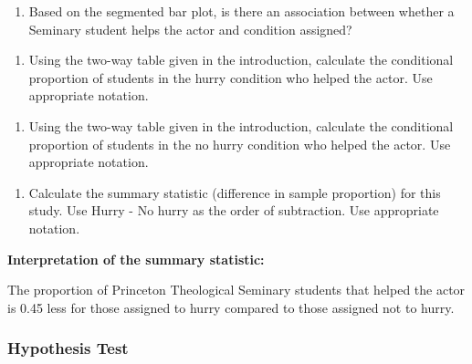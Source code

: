\documentclass[
]{report}
\providecommand{\tightlist}{%
  \setlength{\itemsep}{0pt}\setlength{\parskip}{0pt}}
\begin{document}
\begin{enumerate}
\def\labelenumi{\arabic{enumi}.}
\setcounter{enumi}{2}
\tightlist
\item
  Based on the segmented bar plot, is there an association between whether a Seminary student helps the actor and condition assigned?
\end{enumerate}

\vspace{0.4in}

\begin{enumerate}
\def\labelenumi{\arabic{enumi}.}
\setcounter{enumi}{3}
\tightlist
\item
  Using the two-way table given in the introduction, calculate the conditional proportion of students in the hurry condition who helped the actor. Use appropriate notation.
\end{enumerate}

\vspace{.3in}

\begin{enumerate}
\def\labelenumi{\arabic{enumi}.}
\setcounter{enumi}{4}
\tightlist
\item
  Using the two-way table given in the introduction, calculate the conditional proportion of students in the no hurry condition who helped the actor. Use appropriate notation.
\end{enumerate}

\vspace{.3in}

\begin{enumerate}
\def\labelenumi{\arabic{enumi}.}
\setcounter{enumi}{5}
\tightlist
\item
  Calculate the summary statistic (difference in sample proportion) for this study. Use Hurry - No hurry as the order of subtraction. Use appropriate notation.
\end{enumerate}

\vspace{0.5in}

\textbf{Interpretation of the summary statistic:}

The proportion of Princeton Theological Seminary students that helped the actor is 0.45 less for those assigned to hurry compared to those assigned not to hurry.

\subsubsection*{Hypothesis Test}\label{hypothesis-test-1}
\end{document}
